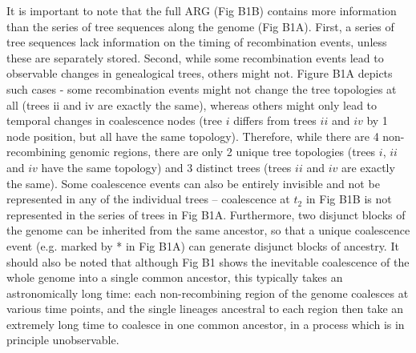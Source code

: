 \documentclass[twocolumn]{bmcart}%
\begin{document}
\begin{strip}
\begin{tcolorbox}[
  colback=blue!1!white,width=\columnwidth,colframe=blue!50!black,title= Box 1: Ancestral Recombination Graph (ARG),width=6.7in]
\begin{multicols}{2}
{It is important to note that the full ARG (Fig B1B) contains more information than the series of tree sequences along the genome (Fig B1A). First, a series of tree sequences lack information on the timing of recombination events, unless these are separately stored. Second, while some recombination events lead to observable changes in genealogical trees, others might not. Figure B1A depicts such cases - some recombination events might not change the tree topologies at all (trees ii and iv are exactly the same), whereas others might only lead to temporal changes in coalescence nodes (tree $i$ differs from trees $ii$ and $iv$ by 1 node position, but all have the same topology). Therefore, while there are 4 non-recombining genomic regions, there are only 2 unique tree topologies (trees $i$, $ii$ and $iv$ have the same topology) and 3 distinct trees (trees $ii$ and $iv$ are exactly the same). Some coalescence events can also be entirely invisible and not be represented in any of the individual trees – coalescence at $t_2$ in Fig B1B is not represented in the series of trees in Fig B1A. Furthermore, two disjunct blocks of the genome can be inherited from the same ancestor, so that a unique coalescence event (e.g. marked by * in Fig B1A) can generate disjunct blocks of ancestry. It should also be noted that although Fig B1 shows the inevitable coalescence of the whole genome into a single common ancestor, this typically takes an astronomically long time: each non-recombining region of the genome coalesces at various time points, and the single lineages ancestral to each region then take an extremely long time to coalesce in one common ancestor, in a process which is in principle unobservable.} \\


\end{multicols}
\end{tcolorbox}
\end{strip}
\end{document}
